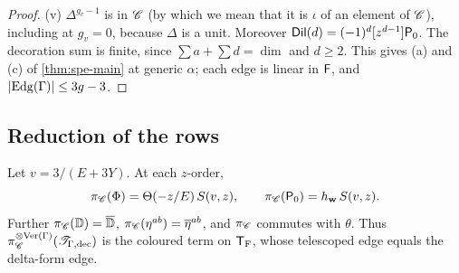 \begin{proof}
(v) $\Delta^{g_v-1}$ is in $\mathscr{C}$ (by which we mean that it is $\iota$ of an element of $\mathscr{C}$), including at $g_v=0$, because $\Delta$ is a unit. Moreover $\mathsf{Dil}(d)=(-1)^d[z^{d-1}]\mathsf{P}_0$. The decoration sum is finite, since $\sum a+\sum d=\dim$ and $d\geq2$. This gives (a) and (c) of \cref{thm:spe-main} at generic $\alpha$; each edge is linear in $\mathsf{F}$, and $|\mathrm{Edg}(\Gamma)|\leq3g-3$.
\end{proof}

\subsection{Reduction of the rows}

\begin{lem}
\label{lem:spe-red}
Let $v=3/(E+3Y)$. At each $z$-order,
\[
\pi_{\mathscr{C}}(\Phi)=\Theta(-z/E)\,S(v,z),\qquad\pi_{\mathscr{C}}(\mathsf{P}_0)=h_{\mathbf{w}}\,S(v,z).
\]
Further $\pi_{\mathscr{C}}(\mathbb{D})=\overline{\mathbb{D}}$, $\pi_{\mathscr{C}}(\eta^{ab})=\overline{\eta}^{ab}$, and $\pi_{\mathscr{C}}$ commutes with $\theta$. Thus $\pi_{\mathscr{C}}^{\otimes\mathrm{Ver}(\Gamma)}(\mathscr{T}_{\Gamma,\mathrm{dec}})$ is the coloured term on $\mathsf{T}_{\mathrm{F}}$, whose telescoped edge equals the delta-form edge.
\end{lem}

